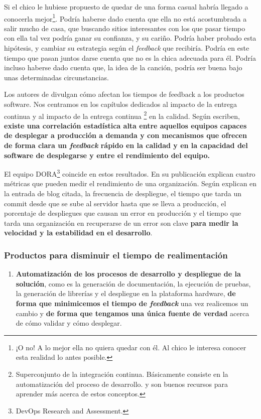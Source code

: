 Si el chico le hubiese propuesto de quedar de una forma casual
habría llegado a conocerla mejor\footnote{¡O no! A lo mejor ella no
quiera quedar con él. Al chico le interesa
conocer esta realidad lo antes posible.}. Podría haberse dado cuenta que
ella no está acostumbrada a salir mucho de casa, que buscando sitios
interesantes con los que pasar tiempo con ella tal vez podría ganar su
confianza, y su cariño. Podría haber probado esta hipótesis, y cambiar
su estrategia según el \textit{feedback} que recibiría. Podría en este tiempo que
pasan juntos darse cuenta que no es la chica adecuada para él. Podría
incluso haberse dado cuenta que, la idea de la canción, podría ser buena
bajo unas determinadas circunstancias.

Los autores de \cite{accelerate} divulgan cómo afectan los tiempos de feedback
a los productos software. Nos centramos en los capítulos dedicados al impacto de
la entrega continua y al impacto de la entrega continua%
\footnote{%
Superconjunto de la integración continua. Básicamente consiste en la automatización
del proceso de desarrollo. \cite{ModernSoftwareEngineering} y \cite{minimumViableCD}
son buenos recursos para aprender más acerca de estos conceptos.%
}%
en la calidad. Según escriben, \textbf{existe una correlación estadística alta entre aquellos
equipos capaces de desplegar a producción a demanda y 
con mecanismos que ofrecen de forma clara un \textit{feedback} rápido en
la calidad y en la capacidad del software de desplegarse y entre el rendimiento del
equipo.}

El equipo DORA\footnote{DevOps Research and Assessment.} coincide en estos resultados.
En su publicación \cite{EliteDevOps} explican cuatro métricas que pueden medir el
rendimiento de una organización. Según explican en la entrada de blog citada,
la frecuencia de despliegue, el tiempo que tarda un commit desde que se sube
al servidor hasta que se lleva a producción,
el porcentaje de despliegues que causan un error en producción y el tiempo
que tarda una organización en recuperarse de un error son clave \textbf{para medir la
velocidad y la estabilidad en el desarrollo}.

\subsubsection{Productos para disminuir el tiempo de realimentación}

\begin{enumerate}
    \item \textbf{Automatización de los procesos de desarrollo y despliegue de la solución}, como es
    la generación de documentación, la ejecución de pruebas, la generación de librerías
    y el despliegue en la plataforma hardware, \textbf{de forma que minimicemos el tiempo de \textit{feedback}}
    una vez realicemos un cambio y \textbf{de forma que tengamos una única fuente de verdad} acerca de cómo
    validar y cómo desplegar.
\end{enumerate}

